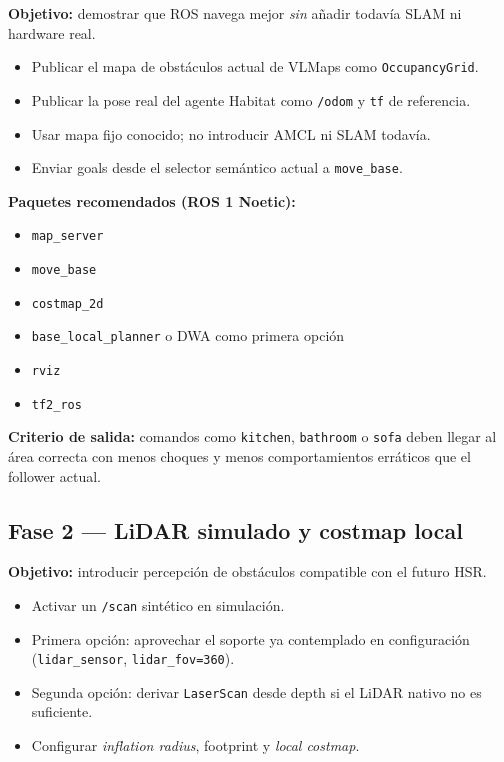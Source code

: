 \documentclass[11pt,a4paper]{article}
\begin{document}
\textbf{Objetivo:} demostrar que ROS navega mejor \emph{sin} añadir todavía
SLAM ni hardware real.

\begin{itemize}
  \item Publicar el mapa de obstáculos actual de VLMaps como
        \texttt{OccupancyGrid}.
  \item Publicar la pose real del agente Habitat como \texttt{/odom} y
        \texttt{tf} de referencia.
  \item Usar mapa fijo conocido; no introducir AMCL ni SLAM todavía.
  \item Enviar goals desde el selector semántico actual a \texttt{move\_base}.
\end{itemize}

\textbf{Paquetes recomendados (ROS 1 Noetic):}
\begin{itemize}
  \item \texttt{map\_server}
  \item \texttt{move\_base}
  \item \texttt{costmap\_2d}
  \item \texttt{base\_local\_planner} o DWA como primera opción
  \item \texttt{rviz}
  \item \texttt{tf2\_ros}
\end{itemize}

\textbf{Criterio de salida:} comandos como \texttt{kitchen}, \texttt{bathroom}
o \texttt{sofa} deben llegar al área correcta con menos choques y menos
comportamientos erráticos que el follower actual.

\subsection{Fase 2 --- LiDAR simulado y costmap local}

\textbf{Objetivo:} introducir percepción de obstáculos compatible con el futuro
HSR.

\begin{itemize}
  \item Activar un \texttt{/scan} sintético en simulación.
  \item Primera opción: aprovechar el soporte ya contemplado en configuración
        (\texttt{lidar\_sensor}, \texttt{lidar\_fov=360}).
  \item Segunda opción: derivar \texttt{LaserScan} desde depth si el LiDAR nativo
        no es suficiente.
  \item Configurar \textit{inflation radius}, footprint y \textit{local costmap}.
\end{itemize}
\end{document}
